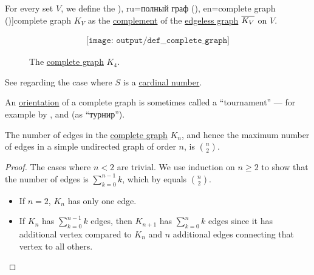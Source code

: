 \begin{definition}\label{def:complete_graph}\mimprovised
  For every set \( V \), we define the \term[bg=пълен граф (\cite[12]{Мирчев2001Графи}), ru=полный граф (\cite[10]{ЕмеличевИПр1990Графы}), en=complete graph (\cite[def. 1.3.1]{Knauer2019AlgGraphTheory})]{complete graph} \( K_V \) as the \hyperref[def:graph_complement]{complement} of the \hyperref[def:edgeless_graph]{edgeless graph} \( \oline{K_V} \) on \( V \).

  \begin{figure}[!ht]
    \begin{equation}\label{eq:fig:def:complete_graph/k4}
      \begin{aligned}
        \texttt{[image: output/def\_\_complete\_graph]}
      \end{aligned}
    \end{equation}
    \caption{The \hyperref[def:complete_graph]{complete graph} \( K_4 \).}\label{fig:def:complete_graph/k4}
  \end{figure}
\end{definition}
\begin{comments}
  \item See  regarding the case where \( S \) is a \hyperref[def:cardinal]{cardinal number}.

  \item An \hyperref[def:multigraph_orientation]{orientation} of a complete graph is sometimes called a \enquote{tournament} --- for example by ,  and  (as \enquote{турнир}).
\end{comments}

\begin{proposition}\label{thm:complete_graph_edge_count}
  The number of edges in the \hyperref[def:complete_graph]{complete graph} \( K_n \), and hence the maximum number of edges in a simple undirected graph of order \( n \), is \( \binom n 2 \).
\end{proposition}
\begin{proof}
  The cases where \( n < 2 \) are trivial. We use induction on \( n \geq 2 \) to show that the number of edges is \( \sum_{k=0}^{n-1} k \), which by  equals \( \binom n 2 \).

  \begin{itemize}
    \item If \( n = 2 \), \( K_n \) has only one edge.
    \item If \( K_n \) has \( \sum_{k=0}^{n-1} k \) edges, then \( K_{n+1} \) has \( \sum_{k=0}^n k \) edges since it has additional vertex compared to \( K_n \) and \( n \) additional edges connecting that vertex to all others.
  \end{itemize}
\end{proof}

